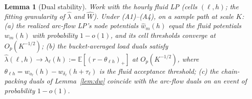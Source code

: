 \documentclass[11pt]{article}
\newtheorem{lemma}{Lemma}
\begin{document}
\begin{lemma}[Dual stability]
\label{lem:stability}
Work with the hourly fluid LP (cells $(\ell, h)$; the fitting
granularity of $\hat{\lambda}$ and $\widehat{W}$). Under (A1)--(A4), on
a sample path at scale $K$: (a) the realized arc-flow LP's node
potentials $\hat{w}_m(h)$ equal the fluid potentials $w_m(h)$ with
probability $1 - o(1)$, and its cell thresholds converge at
$O_p(K^{-1/2})$; (b) the bucket-averaged load duals satisfy
$\hat{\lambda}(\ell, h) \to \lambda_{\ell}(h)
:= \mathbb{E}[(r - \theta_{\ell h})_+]$ at $O_p(K^{-1/2})$, where
$\theta_{\ell h} = w_{o_{\ell}}(h) - w_{\delta_{\ell}}(h + \tau_{\ell})$
is the fluid acceptance threshold; (c) the chain-packing duals of
Lemma~\ref{lem:dw} coincide with the arc-flow duals on an event of
probability $1 - o(1)$.
\end{lemma}
\end{document}
